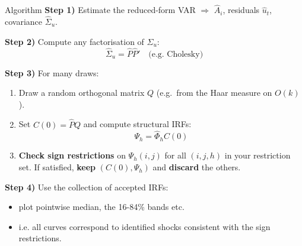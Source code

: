 \documentclass{beamer}
\begin{document}
\begin{frame}{Algorithm}
\small
\textbf{Step 1)} Estimate the reduced-form VAR $\Rightarrow$ $\hat A_i$, residuals $\hat u_t$, covariance $\hat\Sigma_u$.

\medskip
\textbf{Step 2)} Compute any factorisation of $\hat\Sigma_u$:
\[
\hat\Sigma_u = \hat P \hat P'
\quad\text{(e.g.\ Cholesky)}
\]

\medskip
\textbf{Step 3)} For many draws:
\begin{enumerate}
  \item Draw a random orthogonal matrix $Q$ (e.g.\ from the Haar measure on $O(k)$).
  \item Set $C(0) = \hat P Q$ and compute structural IRFs:
        \[
        \Psi_h = \hat\Phi_h C(0)
        \]
  \item \textbf{Check sign restrictions} on $\Psi_h(i,j)$ for all $(i,j,h)$ in your restriction set. If satisfied, \textbf{keep} $(C(0),\Psi_h)$ and \textbf{discard} the others.
\end{enumerate}

\medskip
\textbf{Step 4)} Use the collection of accepted IRFs:
\begin{itemize}
  \item plot pointwise median, the 16-84\% bands etc.
  \item i.e. all curves correspond to identified shocks consistent with the sign restrictions.
\end{itemize}
\end{frame}
\end{document}
